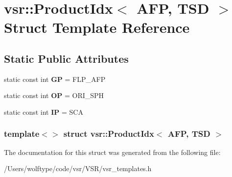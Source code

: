 \hypertarget{structvsr_1_1_product_idx_3_01_a_f_p_00_01_t_s_d_01_4}{\section{vsr\-:\-:Product\-Idx$<$ A\-F\-P, T\-S\-D $>$ Struct Template Reference}
\label{structvsr_1_1_product_idx_3_01_a_f_p_00_01_t_s_d_01_4}
}
\subsection*{Static Public Attributes}
\begin{DoxyCompactItemize}
\item 
\hypertarget{structvsr_1_1_product_idx_3_01_a_f_p_00_01_t_s_d_01_4_ac0aeb22ca2d3816a1d46809ade14799f}{static const int {\bfseries G\-P} = F\-L\-P\-\_\-\-A\-F\-P}\label{structvsr_1_1_product_idx_3_01_a_f_p_00_01_t_s_d_01_4_ac0aeb22ca2d3816a1d46809ade14799f}

\item 
\hypertarget{structvsr_1_1_product_idx_3_01_a_f_p_00_01_t_s_d_01_4_a5b741a659515de4dfcccf121fe047f48}{static const int {\bfseries O\-P} = O\-R\-I\-\_\-\-S\-P\-H}\label{structvsr_1_1_product_idx_3_01_a_f_p_00_01_t_s_d_01_4_a5b741a659515de4dfcccf121fe047f48}

\item 
\hypertarget{structvsr_1_1_product_idx_3_01_a_f_p_00_01_t_s_d_01_4_a82b18c2a198f5a0abfcbcd1ed482d3c2}{static const int {\bfseries I\-P} = S\-C\-A}\label{structvsr_1_1_product_idx_3_01_a_f_p_00_01_t_s_d_01_4_a82b18c2a198f5a0abfcbcd1ed482d3c2}

\end{DoxyCompactItemize}
\subsubsection*{template$<$$>$ struct vsr\-::\-Product\-Idx$<$ A\-F\-P, T\-S\-D $>$}



The documentation for this struct was generated from the following file\-:\begin{DoxyCompactItemize}
\item 
/\-Users/wolftype/code/vsr/\-V\-S\-R/vsr\-\_\-templates.\-h\end{DoxyCompactItemize}
